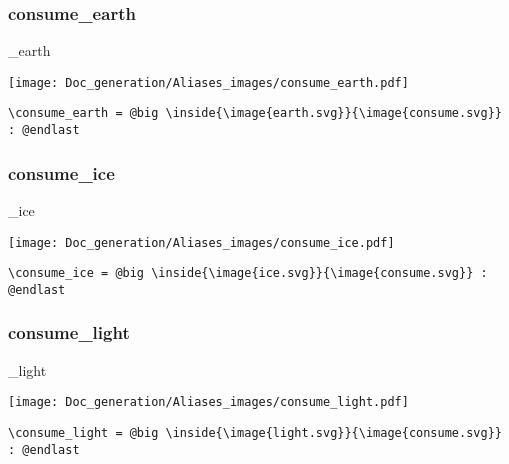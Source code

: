 \documentclass{article}
\begin{document}
\subsubsection{consume\_earth}
\begin{minipage}{0.45\linewidth}
\raggedright
\begin{spverbatim}
\consume_earth
\end{spverbatim}
\end{minipage}
\begin{minipage}{0.45\linewidth}
\raggedleft
\texttt{[image: Doc\_generation/Aliases\_images/consume\_earth.pdf]}
\end{minipage}
\begin{center}
\begin{BVerbatim}
\consume_earth = @big \inside{\image{earth.svg}}{\image{consume.svg}} : @endlast
\end{BVerbatim}
\end{center}

\subsubsection{consume\_ice}
\begin{minipage}{0.45\linewidth}
\raggedright
\begin{spverbatim}
\consume_ice
\end{spverbatim}
\end{minipage}
\begin{minipage}{0.45\linewidth}
\raggedleft
\texttt{[image: Doc\_generation/Aliases\_images/consume\_ice.pdf]}
\end{minipage}
\begin{center}
\begin{BVerbatim}
\consume_ice = @big \inside{\image{ice.svg}}{\image{consume.svg}} : @endlast
\end{BVerbatim}
\end{center}

\subsubsection{consume\_light}
\begin{minipage}{0.45\linewidth}
\raggedright
\begin{spverbatim}
\consume_light
\end{spverbatim}
\end{minipage}
\begin{minipage}{0.45\linewidth}
\raggedleft
\texttt{[image: Doc\_generation/Aliases\_images/consume\_light.pdf]}
\end{minipage}
\begin{center}
\begin{BVerbatim}
\consume_light = @big \inside{\image{light.svg}}{\image{consume.svg}} : @endlast
\end{BVerbatim}
\end{center}
\end{document}
